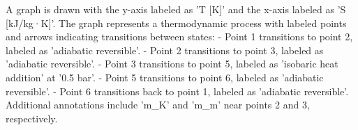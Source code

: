 A graph is drawn with the y-axis labeled as 'T [K]' and the x-axis labeled as 'S [kJ/kg·K]'. The graph represents a thermodynamic process with labeled points and arrows indicating transitions between states:  
- Point 1 transitions to point 2, labeled as 'adiabatic reversible'.  
- Point 2 transitions to point 3, labeled as 'adiabatic reversible'.  
- Point 3 transitions to point 5, labeled as 'isobaric heat addition' at '0.5 bar'.  
- Point 5 transitions to point 6, labeled as 'adiabatic reversible'.  
- Point 6 transitions back to point 1, labeled as 'adiabatic reversible'.  
Additional annotations include 'm_K' and 'm_m' near points 2 and 3, respectively.